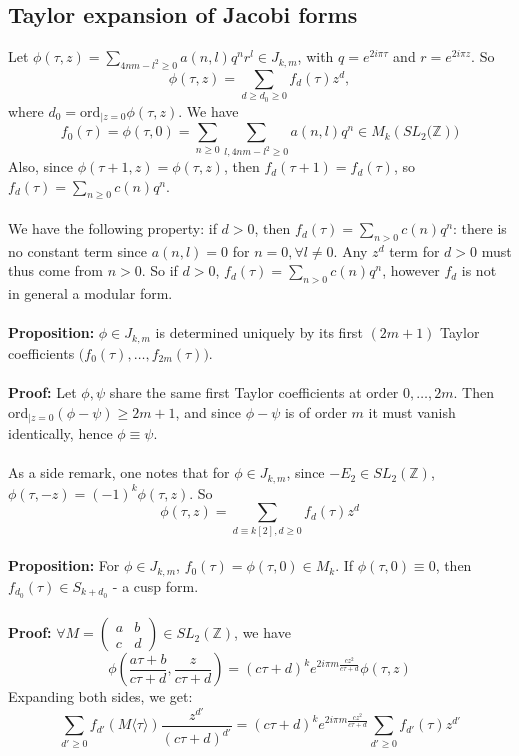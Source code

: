 \documentclass[10pt,a4paper]{article}
\begin{document}
\subsection{Taylor expansion of Jacobi forms}
Let $\phi(\tau,z)=\sum_{4nm-l^2\geq0}a(n,l)q^nr^l\in J_{k,m}$, with $q=e^{2i\pi\tau}$ and $r=e^{2i\pi z}$. So
\[\phi(\tau,z)=\sum_{d\geq d_0\geq0}f_d(\tau)z^d,\]
where $d_0=\textrm{ord}_{|z=0}\phi(\tau,z)$. We have \[f_0(\tau)=\phi(\tau,0)=\sum_{n\geq0}\sum_{l,4nm-l^2\geq0}a(n,l)q^n\in M_k(SL_2\big(\mathbb{Z})\big)\]
Also, since $\phi(\tau+1,z)=\phi(\tau,z)$, then 
$f_d(\tau+1)=f_d(\tau)$, so $f_d(\tau)=\sum_{n\geq0}c(n)q^n$.
\\
\\
We have the following property: if $d>0$, then $f_d(\tau)=\sum_{n>0}c(n)q^n$: there is no constant term since $a(n,l)=0$ for $n=0,\forall l\neq0$. Any $z^d$ term for $d>0$ must thus come from $n>0$. So if $d>0$, $f_d(\tau)=\sum_{n>0}c(n)q^n$, however $f_d$ is not in general a modular form.\\
\\
\textbf{Proposition: } $\phi\in J_{k,m}$ is determined uniquely by its first $(2m+1)$ Taylor coefficients $\big(f_0(\tau),\ldots,f_{2m}(\tau)\big)$.\\
\\
\textbf{Proof: } Let $\phi, \psi$ share the same first Taylor coefficients at order $0,\ldots, 2m$. Then ord$_{|z=0}(\phi-\psi)\geq 2m+1$, and since $\phi-\psi$ is of order $m$ it must vanish identically, hence $\phi\equiv\psi$.
\\
\\
As a side remark, one notes that for $\phi\in J_{k,m}$, since $-E_2\in SL_2(\mathbb{Z})$, $\phi(\tau,-z)=(-1)^k\phi(\tau,z)$. So
\[\phi(\tau,z)=\sum_{d\equiv k[2],d\geq0}f_d(\tau)z^d\]
\\
\textbf{Proposition: } For $\phi\in J_{k,m}$, $f_0(\tau)=\phi(\tau,0)\in M_k$. If $\phi(\tau,0)\equiv0$, then $f_{d_0}(\tau)\in S_{k+d_0}$ - a cusp form.\\
\\
\textbf{Proof: } $\forall M=\left(\begin{array}{cc}a&b\\c&d
\end{array}\right)\in SL_2(\mathbb{Z})$, we have
\[\phi(\frac{a\tau+b}{c\tau+d},\frac{z}{c\tau+d})=(c\tau+d)^ke^{2i\pi m\frac{cz^2}{c\tau+d}}\phi(\tau,z)\]
Expanding both sides, we get:
\[\sum_{d'\geq0}f_{d'}(M\langle\tau\rangle)\frac{z^{d'}}{(c\tau+d)^{d'}}=(c\tau+d)^ke^{2i\pi m\frac{cz^2}{c\tau+d}}\sum_{d'\geq0}f_{d'}(\tau)z^{d'}\]
\end{document}

